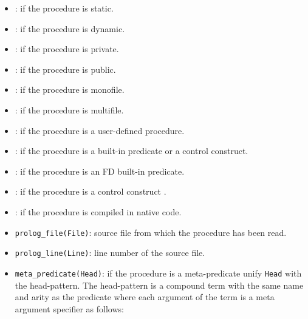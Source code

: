 \begin{itemize}

\item {}: if the procedure is static.

\item {}: if the procedure is dynamic.

\item {}: if the procedure is private.

\item {}: if the procedure is public.

\item {}: if the procedure is monofile.

\item {}: if the procedure is multifile.

\item {}: if the procedure is a user-defined procedure.

\item {}: if the procedure is a built-in predicate or a control construct.

\item {}: if the procedure is an FD built-in predicate.

\item {}: if the procedure is a control construct .

\item {}: if the procedure is compiled in native code.

\item {}\texttt{prolog\_file(File)}: source file from which the
procedure has been read.

\item {}\texttt{prolog\_line(Line)}: line number of the source
file.

\item {}\texttt{meta\_predicate(Head)}: if the procedure is a
  meta-predicate unify \texttt{Head} with the head-pattern. The head-pattern
  is a compound term with the same name and arity as the predicate where each
  argument of the term is a meta argument specifier as follows:

\BL

\begin{description}


\end{description}
\end{itemize}
